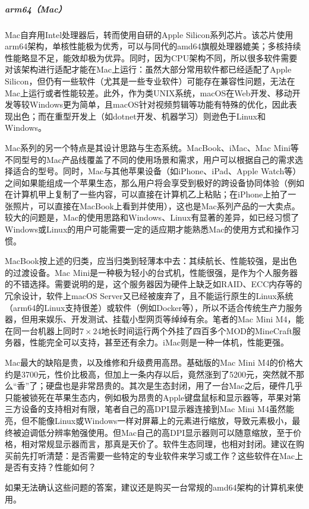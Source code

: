 \subparagraph{arm64（Mac）} Mac自弃用Intel处理器后，转而使用自研的Apple Silicon系列芯片。该芯片使用arm64架构，单核性能极为优秀，可以与同代的amd64旗舰处理器媲美；多核持续性能略显不足，能效却极为优异。同时，因为CPU架构不同，所以很多软件需要对该架构进行适配才能在Mac上运行：虽然大部分常用软件都已经适配了Apple Silicon，但仍有一些软件（尤其是一些专业软件）可能存在兼容性问题，无法在Mac上运行或者性能较差。此外，作为类UNIX系统，macOS在Web开发、移动开发等较Windows更为简单，且macOS针对视频剪辑等功能有特殊的优化，因此表现出色；而在重型开发上（如dotnet开发、机器学习）则逊色于Linux和Windows。

Mac系列的另一个特点是其设计思路与生态系统。MacBook、iMac、Mac Mini等不同型号的Mac产品线覆盖了不同的使用场景和需求，用户可以根据自己的需求选择适合的型号。同时，Mac与其他苹果设备（如iPhone、iPad、Apple Watch等）之间如果能组成一个苹果生态，那么用户将会享受到极好的跨设备协同体验（例如在计算机甲上复制了一些内容，可以直接在计算机乙上粘贴；在iPhone上拍了一张照片，可以直接在MacBook上看到并使用），这也是Mac系列产品的一大卖点。较大的问题是，Mac的使用思路和Windows、Linux有显著的差异，如已经习惯了Windows或Linux的用户可能需要一定的适应期才能熟悉Mac的使用方式和操作习惯。

MacBook按上述的归类，应当归类到轻薄本中去：其续航长、性能较强，是出色的过渡设备。Mac Mini是一种极为轻小的台式机，性能很强，是作为个人服务器的不错选择。需要说明的是，这个服务器因为硬件上缺乏如RAID、ECC内存等的冗余设计，软件上macOS Server又已经被废弃了，且不能运行原生的Linux系统（arm64的Linux支持很差）或软件（例如Docker等），所以不适合传统生产力服务器，但用来娱乐、开发测试、挂载小型网页等绰绰有余。笔者的Mac Mini M4，能在同一台机器上同时$7\times 24$地长时间运行两个外挂了四百多个MOD的MineCraft服务器，性能完全可以支持，甚至还有余力。iMac则是一种一体机，性能更强。

Mac最大的缺陷是贵，以及维修和升级费用高昂。基础版的Mac Mini M4的价格大约是3700元，性价比极高，但加上一条内存以后，竟然涨到了5200元，突然就不那么“香”了；硬盘也是非常昂贵的。其次是生态封闭，用了一台Mac之后，硬件几乎只能被锁死在苹果生态内，例如极为昂贵的Apple键盘鼠标和显示器等，苹果对第三方设备的支持相对有限，笔者自己的高DPI显示器连接到Mac Mini M4虽然能亮，但不能像Linux或Windows一样对屏幕上的元素进行缩放，导致元素极小，最终被迫调低分辨率勉强使用。但Mac自己的高DPI显示器则可以随意缩放，至于价格，相对常规显示器而言，那真是天价了。软件生态同理，也相对封闭。建议在购买前先打听清楚：是否需要一些特定的专业软件来学习或工作？这些软件在Mac上是否有支持？性能如何？

如果无法确认这些问题的答案，建议还是购买一台常规的amd64架构的计算机来使用。

